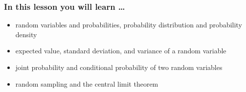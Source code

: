 

\begin{frame}
  \frametitle{In this lesson you will learn \dots}
  \begin{itemize}
  \item random variables and probabilities, probability distribution and probability density
  \item expected value, standard deviation, and variance of a random variable
  \item joint probability and conditional probability of two random variables
  \item random sampling and the central limit theorem
  \end{itemize}
\end{frame}

